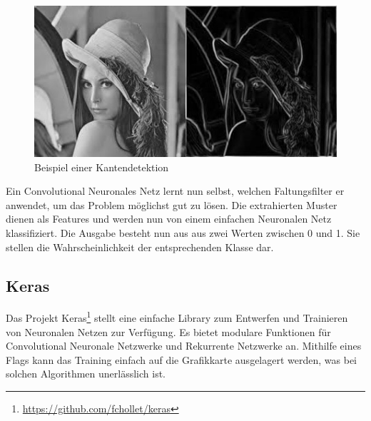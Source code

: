 \begin{figure}[H]
	\includegraphics[width=\textwidth]{images/kantendetektion.jpg}
	\caption{Beispiel einer Kantendetektion}
\end{figure}

Ein Convolutional Neuronales Netz lernt nun selbst, welchen Faltungsfilter er anwendet, um das Problem möglichst gut zu lösen. Die extrahierten Muster dienen als Features und werden nun von einem einfachen Neuronalen Netz klassifiziert. Die Ausgabe besteht nun aus aus zwei Werten zwischen 0 und 1. Sie stellen die Wahrscheinlichkeit der entsprechenden Klasse dar.

\subsection{Keras}
Das Projekt Keras\footnote{\url{https://github.com/fchollet/keras}} stellt eine einfache Library zum Entwerfen und Trainieren von Neuronalen Netzen zur Verfügung. Es bietet modulare Funktionen für Convolutional Neuronale Netzwerke und Rekurrente Netzwerke an. Mithilfe eines Flags kann das Training einfach auf die Grafikkarte ausgelagert werden, was bei solchen Algorithmen unerlässlich ist.